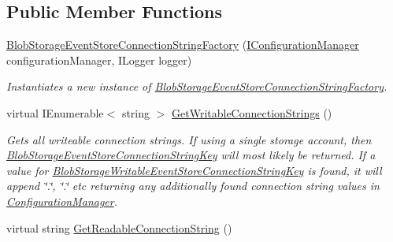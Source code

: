 \subsection*{Public Member Functions}
\begin{DoxyCompactItemize}
\item 
\hyperlink{classCqrs_1_1Azure_1_1BlobStorage_1_1Events_1_1BlobStorageEventStoreConnectionStringFactory_a6ace1481cc61d75f5d472e374566e477_a6ace1481cc61d75f5d472e374566e477}{Blob\+Storage\+Event\+Store\+Connection\+String\+Factory} (\hyperlink{interfaceCqrs_1_1Configuration_1_1IConfigurationManager}{I\+Configuration\+Manager} configuration\+Manager, I\+Logger logger)
\begin{DoxyCompactList}\small\item\em Instantiates a new instance of \hyperlink{classCqrs_1_1Azure_1_1BlobStorage_1_1Events_1_1BlobStorageEventStoreConnectionStringFactory}{Blob\+Storage\+Event\+Store\+Connection\+String\+Factory}. \end{DoxyCompactList}\item 
virtual I\+Enumerable$<$ string $>$ \hyperlink{classCqrs_1_1Azure_1_1BlobStorage_1_1Events_1_1BlobStorageEventStoreConnectionStringFactory_a002b45d6a893b1b3024b0e7c97f1c9ac_a002b45d6a893b1b3024b0e7c97f1c9ac}{Get\+Writable\+Connection\+Strings} ()
\begin{DoxyCompactList}\small\item\em Gets all writeable connection strings. If using a single storage account, then \hyperlink{classCqrs_1_1Azure_1_1BlobStorage_1_1Events_1_1BlobStorageEventStoreConnectionStringFactory_a36edb24cf0ef60114fc344b5d0bb619d_a36edb24cf0ef60114fc344b5d0bb619d}{Blob\+Storage\+Event\+Store\+Connection\+String\+Key} will most likely be returned. If a value for \hyperlink{classCqrs_1_1Azure_1_1BlobStorage_1_1Events_1_1BlobStorageEventStoreConnectionStringFactory_a3bf39254f211e4fbcbd9bc108c8d9fbc_a3bf39254f211e4fbcbd9bc108c8d9fbc}{Blob\+Storage\+Writable\+Event\+Store\+Connection\+String\+Key} is found, it will append \char`\"{}.\char`\"{}, \char`\"{}.\char`\"{} etc returning any additionally found connection string values in \hyperlink{namespaceCqrs_1_1Azure_1_1ConfigurationManager}{Configuration\+Manager}. \end{DoxyCompactList}\item 
virtual string \hyperlink{classCqrs_1_1Azure_1_1BlobStorage_1_1Events_1_1BlobStorageEventStoreConnectionStringFactory_aa47606e4cd5a71437bed71e07fda53ed_aa47606e4cd5a71437bed71e07fda53ed}{Get\+Readable\+Connection\+String} ()

\end{DoxyCompactItemize}
